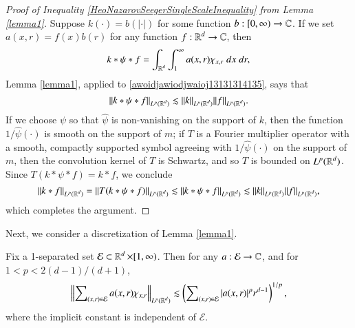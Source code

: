 \begin{proof}[Proof of Inequality \eqref{HeoNazarovSeegerSingleScaleInequality} from Lemma \ref{lemma1}] Suppose $k(\cdot) = b(|\cdot|)$ for some function $b: [0,\infty) \to \operatorname{\mathbb{C}}$. If we set $a(x,r) = f(x) b(r)$ for any function $f: \operatorname{\mathbb{R}}^d \to \operatorname{\mathbb{C}}$, then
%
\begin{equation} \label{awoidjawiodjwaioj13131314135}
  k * \psi * f = \int_{\operatorname{\mathbb{R}}^d} \int_1^\infty a(x,r) \chi_{x, r}\; dx\; dr,
\end{equation}
%
Lemma \ref{lemma1}, applied to \eqref{awoidjawiodjwaioj13131314135}, says that
%
\begin{equation}
  \| k * \psi * f \|_{L^p(\operatorname{\mathbb{R}}^d)} \lesssim \| k \|_{L^p(\operatorname{\mathbb{R}}^d)} \| f \|_{L^p(\operatorname{\mathbb{R}}^d)}.
\end{equation}
%
If we choose $\psi$ so that $\widehat{\psi}$ is non-vanishing on the support of $k$, then the function $1/\widehat{\psi}(\cdot)$ is smooth on the support of $m$; if $T$ is a Fourier multiplier operator with a smooth, compactly supported symbol agreeing with $1/\widehat{\psi}(\cdot)$ on the support of $m$, then the convolution  kernel of $T$ is Schwartz, and so $T$ is bounded on $L^p(\operatorname{\mathbb{R}}^d)$. Since $T(k * \psi * f) = k * f$, we conclude
%
\begin{equation}
  \| k * f \|_{L^p(\operatorname{\mathbb{R}}^d)} = \| T(k * \psi * f) \|_{L^p(\operatorname{\mathbb{R}}^d)} \lesssim \| k * \psi * f \|_{L^p(\operatorname{\mathbb{R}}^d)} \lesssim \| k \|_{L^p(\operatorname{\mathbb{R}}^d)} \| f \|_{L^p(\operatorname{\mathbb{R}}^d)},
\end{equation}
%
which completes the argument.
\end{proof}

Next, we consider a discretization of Lemma \ref{lemma1}.

\begin{lemma} \label{lemma2}
    Fix a 1-separated set $\mathcal{E} \subset \operatorname{\mathbb{R}}^d \times [1,\infty)$. Then for any $a: \mathcal{E} \to \operatorname{\mathbb{C}}$, and for $1 < p < 2(d-1)/(d+1)$,
    \[ \left\| \sum\nolimits_{(x,r) \in \mathcal{E}} a(x,r) \chi_{x, r} \right\|_{L^p(\operatorname{\mathbb{R}}^d)} \lesssim \left( \sum\nolimits_{(x,r) \in \mathcal{E}} |a(x,r)|^p r^{d-1} \right)^{1/p}, \]
    where the implicit constant is independent of $\mathcal{E}$.
\end{lemma}


